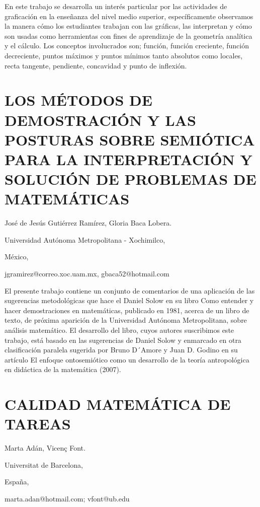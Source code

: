 En este trabajo se desarrolla un interés particular por las actividades
de graficación en la enseñanza del nivel medio superior, específicamente
observamos la manera cómo los estudiantes trabajan con las gráficas,
las interpretan y cómo son usadas como herramientas con fines de aprendizaje
de la geometría analítica y el cálculo. Los conceptos involucrados
son; función, función creciente, función decreciente, puntos máximos
y puntos mínimos tanto absolutos como locales, recta tangente, pendiente,
concavidad y punto de inflexión.


\section{LOS MÉTODOS DE DEMOSTRACIÓN Y LAS POSTURAS SOBRE SEMIÓTICA PARA LA
INTERPRETACIÓN Y SOLUCIÓN DE PROBLEMAS DE MATEMÁTICAS}

\begin{datos}

José de Jesús Gutiérrez Ramírez, Gloria Baca Lobera.

Universidad Autónoma Metropolitana - Xochimilco,

México,

jgramirez@correo.xoc.uam.mx, gbaca52@hotmail.com

\end{datos}

El presente trabajo contiene un conjunto de comentarios de una aplicación
de las sugerencias metodológicas que hace el Daniel Solow en su libro
Como entender y hacer demostraciones en matemáticas, publicado en
1981, acerca de un libro de texto, de próxima aparición de la Universidad
Autónoma Metropolitana, sobre análisis matemático. El desarrollo del
libro, cuyos autores suscribimos este trabajo, está basado en las
sugerencias de Daniel Solow y enmarcado en otra clasificación paralela
sugerida por Bruno D´Amore y Juan D. Godino en su artículo El enfoque
ontosemiótico como un desarrollo de la teoría antropológica en didáctica
de la matemática (2007). 


\section{CALIDAD MATEMÁTICA DE TAREAS}

\begin{datos}

Marta Adán, Vicenç Font.

Universitat de Barcelona,

España,

marta.adan@hotmail.com; vfont@ub.edu

\end{datos}

